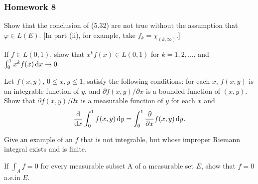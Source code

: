 \subsubsection{Homework 8}
\setcounter{exercise}{0}
\setcounter{equation}{0}

\begin{problem}
  Show that the conclusion of (5.32) are not true without the assumption
  that \(\varphi\in L(E)\). [In part (ii), for example, take
  \(f_k=\chi_{(k,\infty)}\).]
\end{problem}
\begin{solution}
\end{solution}

\begin{problem}
  If \(f\in L(0,1)\), show that \(x^kf(x)\in L(0,1)\) for \(k=1,2,\dotsc\),
  and \(\int_0^1 x^kf(x)\mathop{}\!\mathrm{d} x\to 0\).
\end{problem}
\begin{solution}
\end{solution}

\begin{problem}
  Let \(f(x,y)\), \(0\leq x,y\leq 1\), satisfy the following conditions:
  for each \(x\), \(f(x,y)\) is an integrable function of \(y\), and
  \(\partial f(x,y)/\partial x\) is a bounded function of \((x,y)\). Show
  that \(\partial f(x,y)/\partial x\) is a measurable function of \(y\) for
  each \(x\) and
  \[
    \frac{\mathrm{d}}{\mathrm{d} x}\int_0^1f(x,y)\mathop{}\!\mathrm{d}
    y=\int_0^1\frac{\partial}{\partial x}f(x,y)\mathop{}\!\mathrm{d} y.
  \]
\end{problem}
\begin{solution}
\end{solution}

\begin{problem}
  Give an example of an \(f\) that is not integrable, but whose improper
  Riemann integral exists and is finite.
\end{problem}
\begin{solution}
\end{solution}

\begin{problem}
  If \(\int_A f=0\) for every measurable subset A of a measurable set
  \(E\), show that \(f=0\) a.e.\@ in \(E\).
\end{problem}
\begin{solution}
\end{solution}

